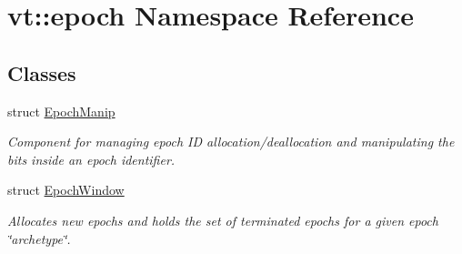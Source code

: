 \hypertarget{namespacevt_1_1epoch}{}\section{vt\+:\+:epoch Namespace Reference}
\label{namespacevt_1_1epoch}
\subsection*{Classes}
\begin{DoxyCompactItemize}
\item 
struct \hyperlink{structvt_1_1epoch_1_1_epoch_manip}{Epoch\+Manip}
\begin{DoxyCompactList}\small\item\em Component for managing epoch ID allocation/deallocation and manipulating the bits inside an epoch identifier. \end{DoxyCompactList}\item 
struct \hyperlink{structvt_1_1epoch_1_1_epoch_window}{Epoch\+Window}
\begin{DoxyCompactList}\small\item\em Allocates new epochs and holds the set of terminated epochs for a given epoch \char`\"{}archetype\char`\"{}. \end{DoxyCompactList}\end{DoxyCompactItemize}
